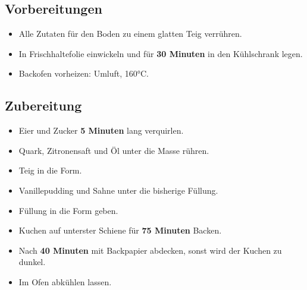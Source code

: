 \subsection*{Vorbereitungen}

\begin{itemize}
    \item Alle Zutaten für den Boden zu einem glatten Teig verrühren.
    \item In Frischhaltefolie einwickeln und für \textbf{30 Minuten} in den Kühlschrank legen.
    \item Backofen vorheizen: Umluft, 160°C.
\end{itemize}


\bigbreak
\subsection*{Zubereitung}

\begin{itemize}
    \item Eier und Zucker \textbf{5 Minuten} lang verquirlen.
    \item Quark, Zitronensaft und Öl unter die Masse rühren.
    \item Teig in die Form.
    \item Vanillepudding und Sahne unter die bisherige Füllung.
    \item Füllung in die Form geben.
    \item Kuchen auf unterster Schiene für \textbf{75 Minuten} Backen.
    \item Nach \textbf{40 Minuten} mit Backpapier abdecken, sonst wird der Kuchen zu dunkel.
    \item Im Ofen abkühlen lassen.
\end{itemize}

